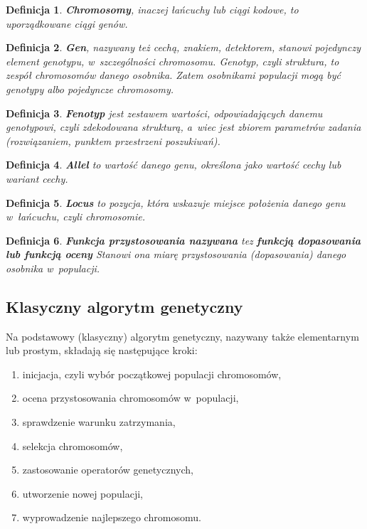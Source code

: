 \documentclass[twoside,12pt]{report}
\newtheorem{definition}{Definicja} %
\begin{document}
\begin{definition}
\textbf{Chromosomy}, inaczej łańcuchy lub ciągi kodowe, to uporządkowane ciągi genów.
\end{definition}

\begin{definition}
\textbf{Gen}, nazywany też cechą, znakiem, detektorem, stanowi pojedynczy element
genotypu, w~szczególności chromosomu. Genotyp, czyli struktura, to zespół chromosomów
danego osobnika. Zatem osobnikami populacji mogą być genotypy albo
pojedyncze chromosomy.
\end{definition}

\begin{definition}
\textbf{Fenotyp} jest zestawem wartości, odpowiadających danemu genotypowi, czyli zdekodowana strukturą, a~wiec jest zbiorem parametrów zadania (rozwiązaniem, punktem przestrzeni
poszukiwań).
\end{definition}

\begin{definition}
\textbf{Allel} to wartość danego genu, określona jako wartość cechy lub wariant cechy.
\end{definition}

\begin{definition}
\textbf{Locus} to pozycja, która wskazuje miejsce położenia danego genu w~łańcuchu, czyli chromosomie.
\end{definition}

\begin{definition}
\textbf{Funkcja przystosowania nazywana} tez \textbf{funkcją dopasowania lub funkcją oceny} Stanowi ona miarę przystosowania (dopasowania) danego osobnika w~populacji.
\end{definition}

\subsection{Klasyczny algorytm genetyczny}

Na podstawowy (klasyczny) algorytm genetyczny, nazywany także elementarnym lub prostym, składają się następujące kroki:

\begin{enumerate}
\item inicjacja, czyli wybór początkowej populacji chromosomów,
\item ocena przystosowania chromosomów w~populacji,
\item sprawdzenie warunku zatrzymania,
\item selekcja chromosomów,
\item zastosowanie operatorów genetycznych,
\item utworzenie nowej populacji,
\item wyprowadzenie najlepszego chromosomu.
\end{enumerate}
\end{document}
